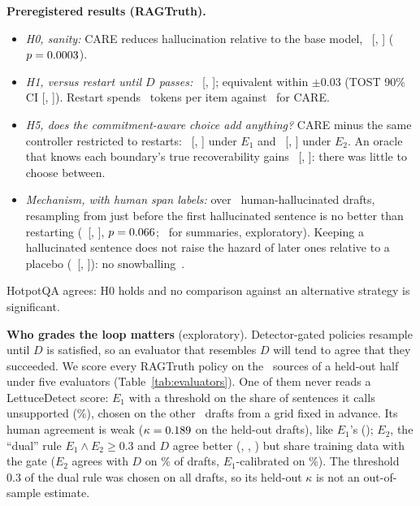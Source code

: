 \textbf{Preregistered results (RAGTruth).}
\begin{itemize}
\item \emph{H0, sanity:} CARE reduces hallucination relative to the base model,
\rrHZero\ [\rrHZeroLo, \rrHZeroHi] ($p=0.0003$).
\item \emph{H1, versus restart until $D$ passes:} \rrHOne\ [\rrHOneLo, \rrHOneHi]; equivalent within
$\pm$0.03 (TOST 90\% CI [\rrTostLo, \rrTostHi]). Restart spends \rrRestartTok\ tokens per item
against \rrCareTok\ for CARE.
\item \emph{H5, does the commitment-aware choice add anything?} CARE minus the same controller
restricted to restarts: \rrHFive\ [\rrHFiveLo, \rrHFiveHi] under $E_1$ and \rrHFiveEtwo\
[\rrHFiveEtwoLo, \rrHFiveEtwoHi] under $E_2$. An oracle that knows each boundary's true
recoverability gains \rrOracle\ [\rrOracleLo, \rrOracleHi]: there was little to choose between.
\item \emph{Mechanism, with human span labels:} over \mechN\ human-hallucinated drafts, resampling
from just before the first hallucinated sentence is no better than restarting (\mechDiff\
[\mechDiffLo, \mechDiffHi], $p=0.066$; \mechSum\ for summaries, exploratory). Keeping a
hallucinated sentence does not raise the hazard of later ones relative to a placebo (\mechSnow\
[\mechSnowLo, \mechSnowHi]): no snowballing~\cite{zhang2024snowball}.
\end{itemize}
HotpotQA agrees: H0 holds and no comparison against an alternative strategy is significant.

\textbf{Who grades the loop matters} (exploratory). Detector-gated policies resample until $D$ is
satisfied, so an evaluator that resembles $D$ will tend to agree that they succeeded. We score
every RAGTruth policy on the \robNTest\ sources of a held-out half under five evaluators
(Table~\ref{tab:evaluators}). One of them never reads a LettuceDetect score: $E_1$ with a threshold on
the share of sentences it calls unsupported (\robFstar\%), chosen on the other \robNDev\ drafts from a
grid fixed in advance. Its human agreement is weak ($\kappa=0.189$ on the held-out drafts),
like $E_1$'s (\robKEOne); $E_2$, the ``dual'' rule $E_1\wedge E_2{\ge}0.3$ and $D$ agree better
(\robKETwo, \robKDual, \robKD) but share training data with the gate ($E_2$ agrees with $D$ on
\robAgreeETwoD\% of drafts, $E_1$-calibrated on \robAgreeEOneD\%). The threshold 0.3 of the dual rule was
chosen on all drafts, so its held-out $\kappa$ is not an out-of-sample estimate.

